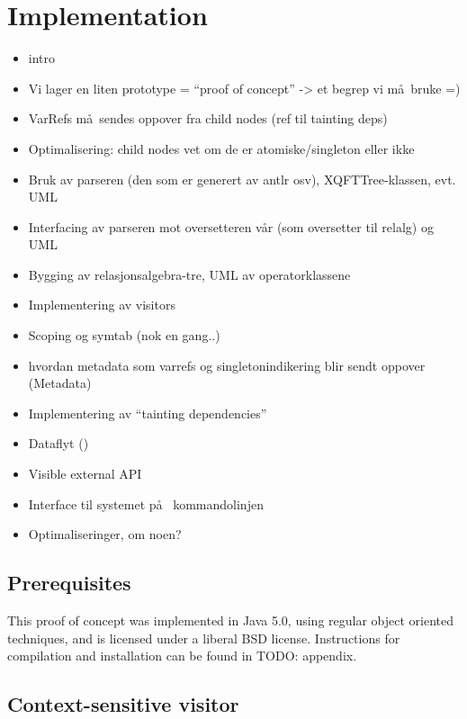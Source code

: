 \chapter{Implementation}
\label{chapter:implementation}

\begin{itemize}
  \item intro
  \item Vi lager en liten prototype = ``proof of concept'' -> et begrep vi m\aa~bruke =)
  \item VarRefs m\aa~sendes oppover fra child nodes (ref til tainting deps)
  \item Optimalisering: child nodes vet om de er atomiske/singleton eller ikke
\end{itemize}

\begin{itemize}
  \item Bruk av parseren (den som er generert av antlr osv), XQFTTree-klassen,
  evt. UML
  \item Interfacing av parseren mot oversetteren v\aa r (som oversetter til
  relalg) og UML
  \item Bygging av relasjonsalgebra-tre, UML av operatorklassene
  \item Implementering av visitors
  \item Scoping og symtab (nok en gang..)
  \item hvordan metadata som varrefs og singletonindikering blir sendt oppover
  (Metadata)
  \item Implementering av ``tainting dependencies''
  \item Dataflyt ()
  \item Visible external API
  \item Interface til systemet p\aa~ kommandolinjen
  \item Optimaliseringer, om noen? 
\end{itemize}

\section{Prerequisites}
This proof of concept was implemented in Java 5.0, using regular object
oriented techniques, and is licensed under a liberal BSD license. Instructions
for compilation and installation can be found in TODO: appendix.




\section{Context-sensitive visitor}
